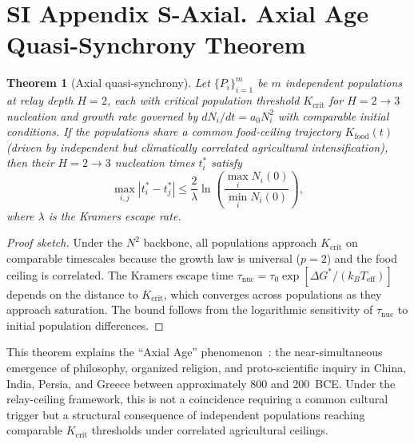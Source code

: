 \documentclass[11pt]{article}
\newtheorem{theorem}{Theorem}
\begin{document}

\section*{SI Appendix S-Axial. Axial Age Quasi-Synchrony Theorem}

\begin{theorem}[Axial quasi-synchrony]
Let $\{P_i\}_{i=1}^{m}$ be $m$ independent populations at relay depth $H=2$, each with critical population threshold $K_{\mathrm{crit}}$ for $H=2\to 3$ nucleation and growth rate governed by $dN_i/dt = a_0 N_i^2$ with comparable initial conditions.
If the populations share a common food-ceiling trajectory $K_{\mathrm{food}}(t)$ (driven by independent but climatically correlated agricultural intensification), then their $H=2\to 3$ nucleation times $t_i^*$ satisfy
\[
\max_{i,j} |t_i^* - t_j^*| \le \frac{2}{\lambda} \ln\!\left(\frac{\max_i N_i(0)}{\min_i N_i(0)}\right),
\]
where $\lambda$ is the Kramers escape rate.
\end{theorem}

\begin{proof}[Proof sketch]
Under the $N^2$ backbone, all populations approach $K_{\mathrm{crit}}$ on comparable timescales because the growth law is universal ($p=2$) and the food ceiling is correlated.
The Kramers escape time $\tau_{\mathrm{nuc}} = \tau_0 \exp[\Delta G^*/(k_B T_{\mathrm{eff}})]$ depends on the distance to $K_{\mathrm{crit}}$, which converges across populations as they approach saturation.
The bound follows from the logarithmic sensitivity of $\tau_{\mathrm{nuc}}$ to initial population differences.
\end{proof}

This theorem explains the ``Axial Age'' phenomenon~\cite{jaspers1953}: the near-simultaneous emergence of philosophy, organized religion, and proto-scientific inquiry in China, India, Persia, and Greece between approximately 800 and 200~BCE.
Under the relay-ceiling framework, this is not a coincidence requiring a common cultural trigger but a structural consequence of independent populations reaching comparable $K_{\mathrm{crit}}$ thresholds under correlated agricultural ceilings.

\end{document}
